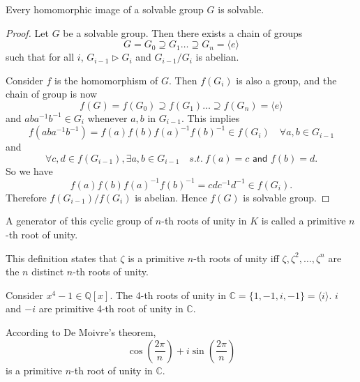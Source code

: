 \begin{theorem}
    Every homomorphic image of a solvable group $G$ is solvable.
\end{theorem}
\begin{proof}
    Let $G$ be a solvable group. Then there exists a chain of groups 
    \[
        G = G_0 \supseteq G_1 \ldots \supseteq G_n = \langle e \rangle
    \]
    such that for all $i$, $G_{i-1} \triangleright G_i$ and $G_{i-1}/G_i$ is abelian.

    Consider $f$ is the homomorphism of $G$. Then $f(G_i)$ is also a group, and the chain of group is now 
    \[
        f(G) = f(G_0) \supseteq f(G_1) \ldots \supseteq f(G_n) = \langle e \rangle
    \]
    and $aba^{-1}b^{-1} \in G_i$ whenever $a,b$ in $G_{i-1}$. This implies 
    \[
        f(aba^{-1}b^{-1}) = f(a)f(b) f(a)^{-1}f(b)^{-1} \in f(G_i) \quad \forall a,b \in G_{i-1}
    \]
    and 
    \[
        \forall c, d \in f(G_{i-1}), \exists a,b \in G_{i-1} \quad s.t. \> f(a) = c \textsf{ and } f(b) =d.
    \]
    So we have 
    \[
        f(a)f(b) f(a)^{-1}f(b)^{-1} = cdc^{-1}d^{-1} \in f(G_i).
    \]
    Therefore $f(G_{i-1})/f(G_i)$ is abelian. Hence $f(G)$ is solvable group.
\end{proof}

\begin{definition}
    A generator of this cyclic group of $n$-th roots of unity in $K$ is called a primitive $n$-th root of unity.
\end{definition}

This definition states that $\zeta$ is a primitive $n$-th roots of unity iff $\zeta, \zeta^2, \ldots, \zeta^n$ 
are the $n$ distinct $n$-th roots of unity.

\begin{example}
    Consider $x^4 - 1 \in \mathbb{Q}[x]$. The 4-th roots of unity in $\mathbb{C} = \{1, -1, i, -1\} = \langle i \rangle$.
    $i$ and $-i$ are primitive 4-th root of unity in $\mathbb{C}$.
\end{example}

\begin{example}
    According to De Moivre's theorem,
    \[
        \cos \left(\frac{2 \pi}{n}\right) + i \sin \left(\frac{2 \pi}{n}\right)
    \]
    is a primitive $n$-th root of unity in $\mathbb{C}$.
\end{example}

